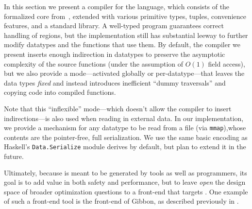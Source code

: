 \documentclass[showabstract,showacknowledgments,showpreface,showdedication]{iuphd}
\theoremstyle{nonumberplain}
\newcommand{\il}[1]{\lstinline[style=inline,mathescape=true];#1;}
\begin{document}
In this section we present a compiler for the \ourcalc language, which consists of
the formalized core from~, extended with various primitive types, tuples,
convenience features, and a standard library.
%
A well-typed \ourcalc program guarantees correct handling of regions, but the
implementation still has substantial leeway to further modify datatypes and 
the functions that use them.
%
By default, the compiler we present inserts enough indirection in
datatypes to preserve the asymptotic complexity of the source functions (under
the assumption of $O(1)$ field access), but we also provide a mode---activated
globally or per-datatype---that leaves the data types
\emph{fixed} and instead introduces inefficient ``dummy traversals'' and copying
code into compiled functions.
%
%

{Note that this ``inflexible'' mode---which doesn't allow the compiler to
  insert indirections---is also used when reading in external data.  In our
  \ourcalc implementation, we provide a mechanism for any datatype to be read
  from a file (via \il{mmap}),whose contents are the pointer-free, full
  serialization.  We use the same basic encoding as Haskell's
  \il{Data.Serialize} module derives by default, but plan to extend it in the
  future.}

Ultimately, because \ourcalc is meant to be generated by tools as well as programmers,
its goal is to add value in both safety and performance, but to leave
\emph{open} the design space of broader optimization questions to a front-end that
targets \ourcalc{}. One example of such a front-end tool is the front-end of
Gibbon, as described previously in .
\end{document}
